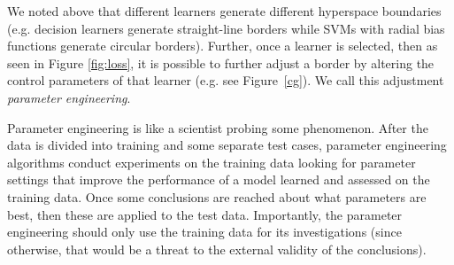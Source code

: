 We noted above that different learners
generate different hyperspace
boundaries (e.g. decision learners generate
straight-line borders while SVMs with radial bias functions generate circular borders). Further, once a learner
is selected, then as seen in Figure \ref{fig:loss}, 
it is possible to further adjust
a border by altering the   control parameters of
 that learner (e.g. see Figure~\ref{cg}).  We call this adjustment
 {\em parameter engineering}.
 
 Parameter engineering is like a scientist probing some phenomenon. After the data is divided into training and some
 separate test cases, parameter engineering algorithms conduct experiments on the training data looking for parameter settings
 that improve the performance of a model learned and assessed
 on the training data. Once some conclusions are
 reached about what parameters are best, then these are applied
 to the test data. Importantly, the parameter engineering  should only use the training    data for its investigations (since otherwise, that
 would be a threat to the external validity of the conclusions).
 
